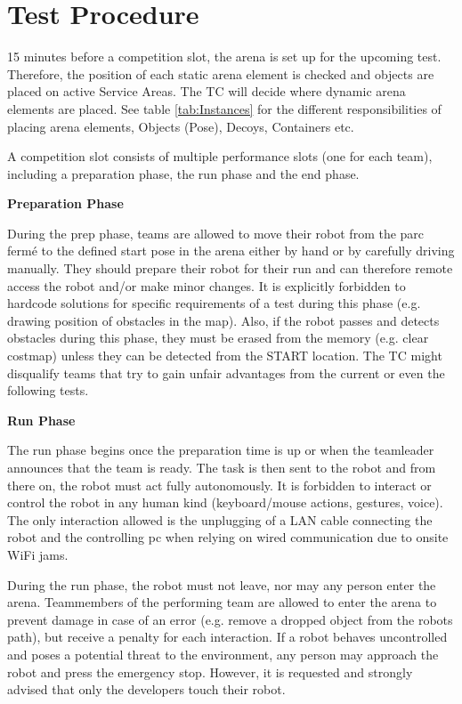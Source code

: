 \section{Test Procedure}

15 minutes before a competition slot, the arena is set up for the upcoming test.
Therefore, the position of each static arena element is checked and objects are placed on active 
Service Areas.
The TC will decide where dynamic arena elements are placed. See table \ref{tab:Instances} for the different responsibilities of placing arena elements, Objects (Pose), Decoys, Containers etc.

A competition slot consists of multiple performance slots (one for each team), 
including a preparation phase, the run phase and the end phase.

\textbf{Preparation Phase}

During the prep phase, teams are allowed to move their robot from the parc ferm\'e to the defined start pose in the arena either by hand or by carefully driving manually. They should prepare their robot for their run and can therefore remote access the robot and/or make minor changes.
It is explicitly forbidden to hardcode solutions for specific requirements of a test during this phase (e.g. drawing position of obstacles in the map). Also, if the robot passes and detects obstacles during this phase, they must be erased from the memory (e.g. clear costmap) unless they can be detected from the START location. The TC might disqualify teams that try to gain unfair advantages from the current or even the following tests.

\textbf{Run Phase}

The run phase begins once the preparation time is up or when the teamleader announces that the team is ready. 
The task is then sent to the robot and from there on, the robot must act fully autonomously. 
It is forbidden to interact or control the robot in any human kind (keyboard/mouse actions, gestures, voice). 
The only interaction allowed is the unplugging of a LAN cable connecting the robot and the controlling pc
when relying on wired communication due to onsite WiFi jams.

During the run phase, the robot must not leave, nor may any person enter the arena.
Teammembers of the performing team are allowed to enter the arena to prevent damage in case of an error (e.g. remove a dropped object from the robots path), but receive a penalty for each interaction.
If a robot behaves uncontrolled and poses a potential threat to the environment,
any person may approach the robot and press the emergency stop.
However, it is requested and strongly advised that only the developers touch their robot.

